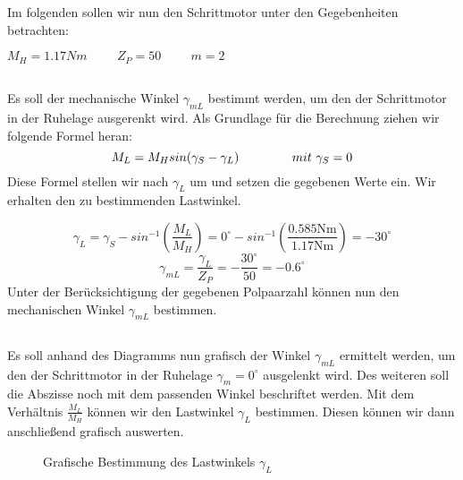 \chapter{}\label{ch:aufg3}
Im folgenden sollen wir nun den Schrittmotor unter den Gegebenheiten betrachten:
\begin{center}
	$ M_{H} = 1.17Nm \hspace{1cm} Z_{P} = 50 \hspace{1cm} m = 2 $
\end{center}

\section{}\label{sec:3a}
Es soll der mechanische Winkel $ \gamma_{mL} $ bestimmt werden, um den der Schrittmotor in der Ruhelage ausgerenkt wird. Als Grundlage für die Berechnung ziehen wir folgende Formel heran:
\begin{equation}
	M_{L} = M_{H}sin(\gamma_{S}-\gamma_{L}) \hspace{1.5cm} mit~\gamma_{S} = 0
\end{equation}
Diese Formel stellen wir nach $ \gamma_{L} $ um und setzen die gegebenen Werte ein. Wir erhalten den zu bestimmenden Lastwinkel.

\begin{equation}
	\gamma_{L} = \gamma_{S} - sin^{-1}\left(\frac{M_{L}}{M_{H}}\right) = 0^{\circ} - sin^{-1}\left(\frac{0.585\text{Nm}}{1.17\text{Nm}}\right) = -30^{\circ}
\end{equation}
\begin{equation}
	\gamma_{mL} = \frac{\gamma_{L}}{Z_{P}} = -\frac{30^{\circ}}{50} = -0.6^{\circ}
\end{equation}
Unter der Berücksichtigung der gegebenen Polpaarzahl können nun den mechanischen Winkel $ \gamma_{mL} $ bestimmen.

\section{}\label{sec:3b}
Es soll anhand des Diagramms nun grafisch der Winkel $ \gamma_{mL} $ ermittelt werden, um den der Schrittmotor in der Ruhelage $ \gamma_{m} = 0^{\circ} $ ausgelenkt wird. Des weiteren soll die Abszisse noch mit dem passenden Winkel beschriftet werden. Mit dem Verhältnis $ \frac{M_{L}}{M_{H}} $ können wir den Lastwinkel $ \gamma_{L} $ bestimmen. Diesen können wir dann anschließend grafisch auswerten.
\begin{figure}[t]
	\centering
	
	\caption{Grafische Bestimmung des Lastwinkels $ \gamma_{L} $}
	\label{fig:3b:gamma}
\end{figure}

